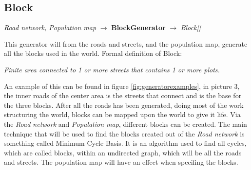 \subsection{Block}
\begin{center}
    \textit{Road network, Population map} $\rightarrow$ \textbf{BlockGenerator} $\rightarrow$ \textit{Block{[}{]}}
\end{center}
This generator will from the roads and streets, and the population map, generate all the blocks used in the world.
Formal definition of Block:
\begin{center}
    \textit{Finite area connected to 1 or more streets that contains 1 or more plots.}
\end{center}
An example of this can be found in figure \ref{fig:generatorexamples}, in picture 3, the inner roads of the center area is the streets that connect and is the base for the three blocks.
After all the roads has been generated, doing most of the work structuring the world, blocks can be mapped upon the world to give it life.
Via the \textit{Road network} and \textit{Population map}, different blocks can be created. 
The main technique that will be used to find the blocks created out of the \textit{Road network} is something called Minimum Cycle Basis.
It is an algorithm used to find all cycles, which are called blocks, within an undirected graph, which will be all the roads and streets. 
The population map will have an effect when specifing the blocks. 